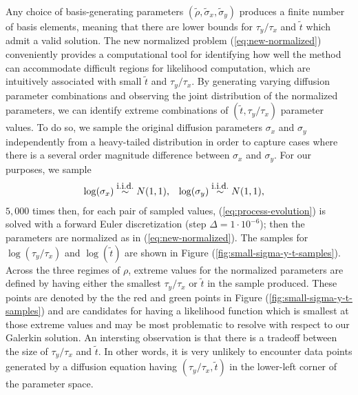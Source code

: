 \documentclass[10pt]{article}
\begin{document}
\begin{enumerate}
Any choice of basis-generating parameters
$(\tilde{\rho}, \tilde{\sigma}_x, \tilde{\sigma}_y)$ produces a finite
number of basis elements, meaning that there are lower bounds for
$\tau_y/\tau_x$ and $\tilde{t}$ which admit a valid solution. The new
normalized problem (\ref{eq:new-normalized}) conveniently provides a
computational tool for identifying how well the method can accommodate
difficult regions for likelihood computation, which are intuitively
associated with small $\tilde{t}$ and $\tau_y/\tau_x$. By generating
varying diffusion parameter combinations and observing the joint
distribution of the normalized parameters, we can identify extreme
combinations of $(\tilde{t}, \tau_y/\tau_x)$ parameter values. To do
so, we sample the original diffusion parameters $\sigma_x$ and
$\sigma_y$ independently from a heavy-tailed distribution in order to
capture cases where there is a several order magnitude difference
between $\sigma_x$ and $\sigma_y$. For our purposes, we sample
\begin{align}
  \log(\sigma_x) &\overset{\mbox{\small i.i.d.}}{\sim} N(1,1), &
  \log(\sigma_y) &\overset{\mbox{\small i.i.d.}}{\sim} N(1,1),
\end{align}
$5,000$ times then, for each pair of sampled values,
(\ref{eq:process-evolution}) is solved with a forward Euler
discretization (step $\Delta = 1\cdot 10^{-6}$); then the parameters
are normalized as in (\ref{eq:new-normalized}). The samples for
$\log(\tau_y/\tau_x)$ and $\log(\tilde{t})$ are shown in Figure
(\ref{fig:small-sigma-y-t-samples}). Across the three regimes of
$\rho$, extreme values for the normalized parameters are defined by
having either the smallest $\tau_y/\tau_x$ or $\tilde{t}$ in the
sample produced. These points are denoted by the the red and green
points in Figure (\ref{fig:small-sigma-y-t-samples}) and are
candidates for having a likelihood function which is smallest at those
extreme values and may be most problematic to resolve with respect to
our Galerkin solution. An intersting observation is that there is a
tradeoff between the size of $\tau_y/\tau_x$ and $\tilde{t}$. In other
words, it is very unlikely to encounter data points generated by a
diffusion equation having $(\tau_y/\tau_x, \tilde{t})$ in the
lower-left corner of the parameter space.


\end{enumerate}
\end{document}
